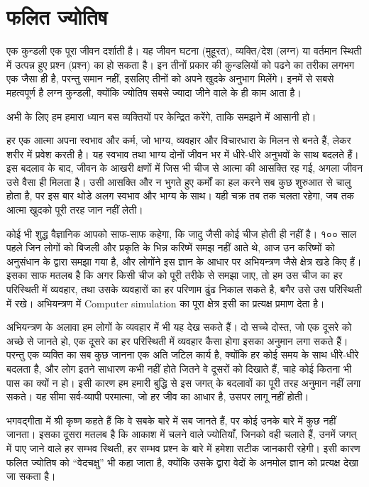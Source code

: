 \part{फलित ज्योतिष} \label{part:pred}
एक कुन्डली एक पूरा जीवन दर्शाती है। यह जीवन घटना (मुहूरत), व्यक्ति/देश (लग्न) या वर्तमान स्थिती में उत्पन्न हुए प्रश्न (प्रश्न) का हो सकता है। इन तीनों प्रकार की कुन्डलियों को पढने का तरीका लगभग एक जैसा ही है, परन्तु समान नहीं, इसलिए तीनों को अपने खुदके  अनुभाग मिलेंगे। इनमें से सबसे महत्वपूर्ण है लग्न कुन्डली, क्योंकि ज्योतिष सबसे ज्यादा जीने वाले के ही काम आता है।

अभी के लिए हम हमारा ध्यान बस व्यक्तियों पर केन्द्रित करेंगे, ताकि समझने में आसानी हो। 

हर एक आत्मा अपना स्वभाव और कर्म, जो भाग्य, व्यवहार और  विचारधारा के मिलन से बनते हैं, लेकर शरीर में प्रवेश करती है। यह स्वभाव तथा भाग्य दोनों जीवन भर में धीरे-धीरे अनुभवों के साथ बदलते हैं। इस बदलाव के बाद, जीवन के आखरी क्षणों में जिस भी चीज से आत्मा की आसक्ति रह गई, अगला जीवन उसे वैसा ही मिलता है। उसी आसक्ति और न भुगते हुए कर्मों का हल करने सब कुछ शुरुआत से चालु होता है, पर इस बार थोडे अलग स्वभाव और भाग्य के साथ। यही चक्र तब तक चलता रहेगा, जब तक आत्मा खुदको पूरी तरह जान नहीं लेती।

कोई भी शुद्ध वैज्ञानिक आपको साफ-साफ कहेगा, कि जादु जैसी कोई चीज होती ही नहीं है। १०० साल पहले जिन लोगों को  बिजली और प्रकृति के भिन्न करिष्में समझ नहीं आते थे, आज उन करिष्मों को अनुसंधान के द्वारा समझा गया है, और लोगोंने इस ज्ञान के आधार पर अभियन्त्रण जैसे क्षेत्र खडे किए हैं। इसका साफ मतलब है कि अगर किसी चीज को पूरी तरीके से समझा जाए, तो हम उस चीज का हर परिस्थिती में व्यवहार, तथा उसके व्यवहारों का हर परिणाम ढुंढ निकाल सकते है, बगैर उसे उस परिस्थिती में रखे। अभियन्त्रण में \textenglish{Computer simulation} का पूरा क्षेत्र इसी का प्रत्यक्ष प्रमाण देता है।

अभियन्त्रण के अलावा हम लोगों के व्यवहार में भी यह देख सकते हैं। दो सच्चे दोस्त, जो एक दूसरे को अच्छे से जानते हो, एक दूसरे का हर परिस्थिती में व्यवहार कैसा होगा इसका अनुमान लगा सकते हैं। परन्तु एक व्यक्ति का सब कुछ जानना एक अति जटिल कार्य है, क्योंकि हर कोई समय के साथ धीरे-धीरे बदलता है, और लोग इतने साधारण कभी नहीं होते जितने वे दूसरों को दिखाते हैं, चाहे कोई कितना भी पास का क्यों न हो। इसी कारण हम हमारी बुद्धि से इस जगत् के बदलावों का पूरी तरह अनुमान नहीं लगा सकते। यह सीमा सर्व-व्यापी परमात्मा, जो हर जीव का आधार है, उसपर लागू नहीं होती।

भगवद्गीता में श्री कृष्ण कहते हैं कि वे सबके बारे में सब जानते हैं, पर कोई उनके बारे में कुछ नहीं जानता। इसका दूसरा मतलब है कि आकाश में चलने वाले ज्योतियाँ, जिनको वही चलाते हैं, उनमें जगत् में पाए जाने वाले हर सम्भव स्थिती, हर सम्भव प्रश्न के बारे में हमेशा सटीक जानकारी रहेगी। इसी कारण फलित ज्योतिष को ``वेदचक्षु'' भी कहा जाता है, क्योंकि उसके द्वारा वेदों के अनमोल ज्ञान को प्रत्यक्ष देखा जा सकता है।

